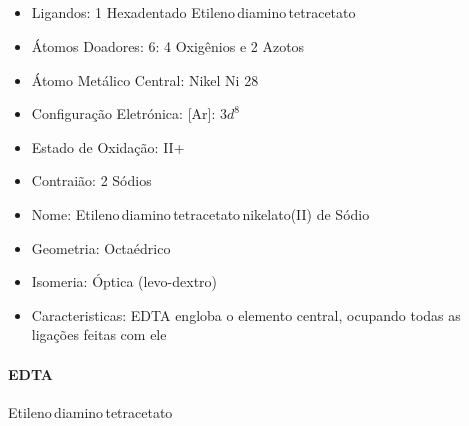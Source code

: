 \documentclass[12pt]{article}
\begin{document}
	\subsection{}
	\begin{itemize}
   
   
   \item Ligandos: 1 Hexadentado Etileno\,diamino\,tetracetato
   
   
   \item Átomos Doadores: 6: 4 Oxigênios e 2 Azotos
   
   \item Átomo Metálico Central: Nikel Ni 28
   
   \item Configuração Eletrónica: [Ar]: $ 3d^8 $
   
   \item Estado de Oxidação: II+
   
   \item Contraião: 2 Sódios 
   
   \item Nome: Etileno\,diamino\,tetracetato\,nikelato(II) de Sódio
   
   \item Geometria: Octaédrico
   
   \item Isomeria: Óptica (levo-dextro)

	\item Caracteristicas: EDTA engloba o elemento central, ocupando todas as ligações feitas com ele

	\end{itemize}
	
	\paragraph{EDTA} Etileno\,diamino\,tetracetato
	
\break


	
\end{document}

